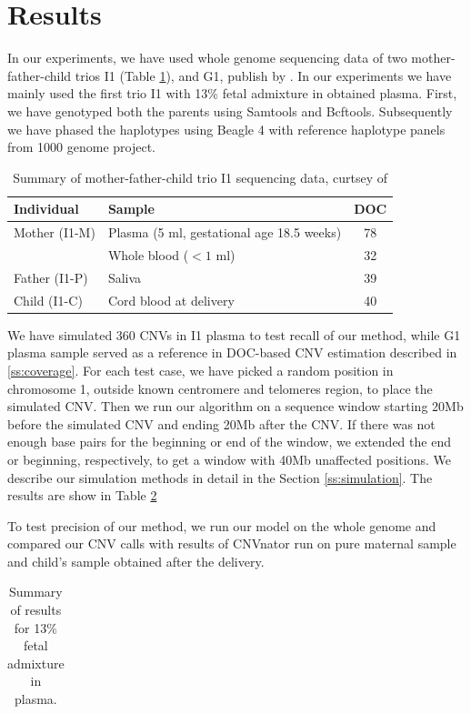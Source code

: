 \section{Results}
In our experiments, we have used whole genome sequencing data of two mother-father-child trios I1 (Table \ref{tab:I1}), and G1, publish by \cite{kitzman2012}. In our experiments we have mainly used the first trio I1 with 13\% fetal admixture in obtained plasma. First, we have genotyped both the parents using Samtools and Bcftools. Subsequently we have phased the haplotypes using Beagle 4 \cite{browning2013} with reference haplotype panels from 1000 genome project.

\begin{table}[t]
\centering
\begin{tabular}{l|l|c}
Individual & Sample & DOC \\ \hline
Mother (I1-M) & Plasma (5 ml, gestational age 18.5 weeks) & 78 \\
	& Whole blood ($<1$ ml) & 32 \\
Father (I1-P) & Saliva & 39 \\
Child (I1-C) & Cord blood at delivery & 40
\end{tabular}
\vspace{3pt}
\caption{Summary of mother-father-child trio I1 sequencing data, curtsey of \cite{kitzman2012}  }
\label{tab:I1} 
\end{table}

We have simulated 360 CNVs in I1 plasma to test recall of our method, while G1 plasma sample served as a reference in DOC-based CNV estimation described in \ref{ss:coverage}. For each test case, we have picked a random position in chromosome 1, outside known centromere and telomeres region, to place the simulated CNV. Then we run our algorithm on a sequence window starting 20Mb before the simulated CNV and ending 20Mb after the CNV. If there was not enough base pairs for the beginning or end of the window, we extended the end or beginning, respectively, to get a window with 40Mb unaffected positions. We describe our simulation methods in detail in the Section \ref{ss:simulation}. The results are show in Table \ref{tab:resff13}

To test precision of our method, we run our model on the whole genome and compared our CNV calls with results of CNVnator \cite{abyzov2011cnvnator} run on pure maternal sample and child's sample obtained after the delivery.

\begin{table}[t]
\centering
{}
\begin{tabular}{l|l|c}
\end{tabular}
\caption{Summary of results for 13\% fetal admixture in plasma. }
\label{tab:resff13} 
\end{table}

